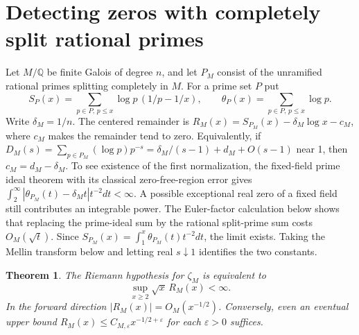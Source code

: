 \documentclass[11pt]{article}
\newtheorem{theorem}{Theorem}
\newcommand{\Q}{\mathbb Q}\newcommand{\R}{\mathbb R}
\begin{document}
\section{Detecting zeros with completely split rational primes}

Let $M/\Q$ be finite Galois of degree $n$, and let $P_M$ consist of the unramified rational primes splitting completely in $M$. For a prime set $P$ put
\[
 S_P(x)=\sum_{p\in P,\,p\le x}\log p\,(1/p-1/x),
 \qquad \theta_P(x)=\sum_{p\in P,\,p\le x}\log p .
\]
Write $\delta_M=1/n$. The centered remainder is
$R_M(x)=S_{P_M}(x)-\delta_M\log x-c_M$, where $c_M$ makes the remainder tend to zero. Equivalently, if
$D_M(s)=\sum_{p\in P_M}(\log p)p^{-s}=\delta_M/(s-1)+d_M+O(s-1)$ near 1, then $c_M=d_M-\delta_M$. To see existence of the first normalization, the fixed-field prime ideal theorem with its classical zero-free-region error gives $\int_2^\infty |\theta_{P_M}(t)-\delta_M t|t^{-2}dt<\infty$. A possible exceptional real zero of a fixed field still contributes an integrable power. The Euler-factor calculation below shows that replacing the prime-ideal sum by the rational split-prime sum costs $O_M(\sqrt t)$. Since $S_{P_M}(x)=\int_1^x\theta_{P_M}(t)t^{-2}dt$, the limit exists. Taking the Mellin transform below and letting real $s\downarrow1$ identifies the two constants.

\begin{theorem}\label{thm:detect}
The Riemann hypothesis for $\zeta_M$ is equivalent to
\[
               \sup_{x\ge2}\sqrt{x}\,R_M(x)<\infty .
\]
In the forward direction $|R_M(x)|=O_M(x^{-1/2})$. Conversely, even an eventual upper bound $R_M(x)\le C_{M,\varepsilon}x^{-1/2+\varepsilon}$ for each $\varepsilon>0$ suffices.
\end{theorem}
\end{document}
